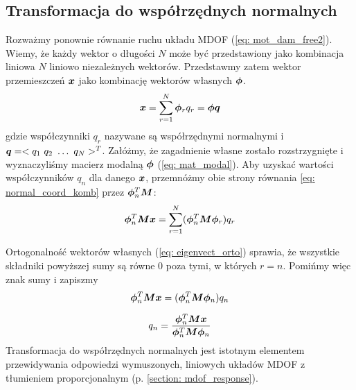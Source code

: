 \subsection{Transformacja do współrzędnych normalnych} \label{section: transform_normal}
Rozważmy ponownie równanie ruchu układu MDOF (\ref{eq: mot_dam_free2}). Wiemy, że każdy wektor o długości $N$ może być przedstawiony jako kombinacja liniowa $N$ liniowo niezależnych wektorów. Przedstawmy zatem wektor przemieszczeń $\bm{x}$ jako kombinację wektorów własnych $\bm{\phi}$.
\begin{equation} \label{eq: normal_coord_komb}
	\bm{x} = \sum_{r=1}^{N} \bm{\phi}_r q_r=\bm{\phi q}
\end{equation} 
gdzie współczynniki $q_r$ nazywane są współrzędnymi normalnymi  i $\bm{q}=<q_1\,\,q_2\,\, \dots\,\, q_N>^T$. Załóżmy, że zagadnienie własne zostało rozstrzygnięte i wyznaczyliśmy macierz modalną $\bm{\phi}$ (\ref{eq: mat_modal}). Aby uzyskać wartości współczynników $q_n$ dla danego $\bm{x}$, przemnóżmy obie strony równania \ref{eq: normal_coord_komb} przez $\bm{\phi}_n^T\bm{M}$:
\begin{equation} \label{eq: normal_coord_komb2}
	\bm{\phi}_n^T\bm{M}\bm{x} = \sum_{r=1}^{N} (\bm{\phi}_n^T\bm{M}\bm{\phi}_r) q_r
\end{equation} 

Ortogonalność wektorów własnych (\ref{eq: eigenvect_orto}) sprawia, że wszystkie składniki powyższej sumy są równe 0 poza tymi, w których $r=n$. Pomińmy więc znak sumy i zapiszmy 
\begin{equation} \label{eq: normal_coord_kom3}
	\bm{\phi}_n^T\bm{M}\bm{x} = (\bm{\phi}_n^T\bm{M}\bm{\phi}_n) q_n
\end{equation} 

\begin{equation} \label{eq: normal_coord_kom4}
	q_n = \frac{\bm{\phi}_n^T\bm{M}\bm{x}}{\bm{\phi}_n^T\bm{M}\bm{\phi}_n} 
\end{equation} 
Transformacja do współrzędnych normalnych jest istotnym elementem przewidywania odpowiedzi wymuszonych, liniowych układów MDOF z tłumieniem proporcjonalnym (p. \ref{section: mdof_response}).

